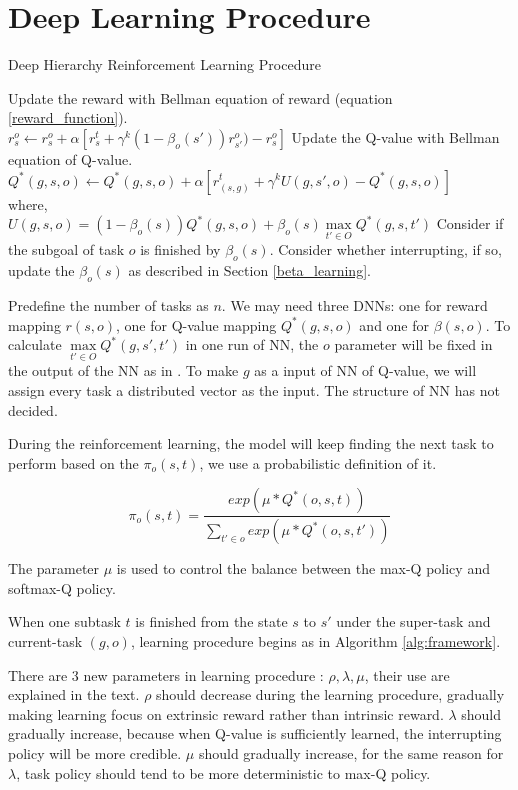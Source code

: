 \documentclass{article}
\begin{document}
\section{Deep Learning Procedure}
\begin{algorithm}[t]
\caption{Deep Hierarchy Reinforcement Learning Procedure}
\label{alg:framework}
\begin{algorithmic}[1]
\STATE Update the reward with Bellman equation of reward (equation \ref{reward_function}).\\
$r^o_s \leftarrow r^o_s+\alpha[r^t_s+\gamma^k(1-\beta_o(s'))r^o_{s'})-r^o_s]$
\STATE Update the Q-value with Bellman equation of Q-value.\\
$Q^*(g,s,o) \leftarrow Q^*(g,s,o) + \alpha[r^t_{(s,g)}+\gamma^kU(g,s',o)-Q^*(g,s,o)]$\\
where, \\
$U(g,s,o)=(1-\beta_o(s))Q^*(g,s,o)+\beta_o(s)\max \limits_{t'\in O}Q^*(g,s,t')$       
\STATE Consider if the subgoal of task $o$ is finished by $\beta_o(s)$.
\STATE Consider whether interrupting, if so, update the $\beta_o(s)$ as described in Section \ref{beta_learning}.
\end{algorithmic}
\end{algorithm}

Predefine the number of tasks as $n$.
We may need three DNNs: one for reward mapping $r(s,o)$, one for Q-value mapping $Q^*(g,s,o)$ and one for $\beta(s,o)$. To calculate $\max \limits_{t'\in O}Q^*(g,s',t')$ in one run of NN, the $o$ parameter will be fixed in the output of the NN as in \cite{mnih2015human-level}. To make $g$ as a input of NN of Q-value, we will assign every task a distributed vector as the input. The structure of NN has not decided. 

During the reinforcement learning, the model will keep finding the next task to perform based on the $\pi_o(s,t)$, we use a probabilistic definition of it.

\begin{equation}\label{policy_function}
\pi_o(s,t)=\frac{exp(\mu*Q^*(o,s,t))}{\sum_{t'\in o}{exp(\mu*Q^*(o,s,t'))}}
\end{equation}

The parameter $\mu$ is used to control the balance between the max-Q policy and softmax-Q policy.

When one subtask $t$ is finished from the state $s$ to $s'$ under the super-task and current-task $(g,o)$, learning procedure begins as in Algorithm \ref{alg:framework}.

There are 3 new parameters in learning procedure : $\rho, \lambda, \mu$, their use are explained in the text. $\rho$ should decrease during the learning procedure, gradually making learning focus on extrinsic reward rather than intrinsic reward. $\lambda$ should gradually increase, because when Q-value is sufficiently learned, the interrupting policy will be more credible. $\mu$ should gradually increase, for the same reason for $\lambda$, task policy should tend to be more deterministic to max-Q policy.



\end{document}
